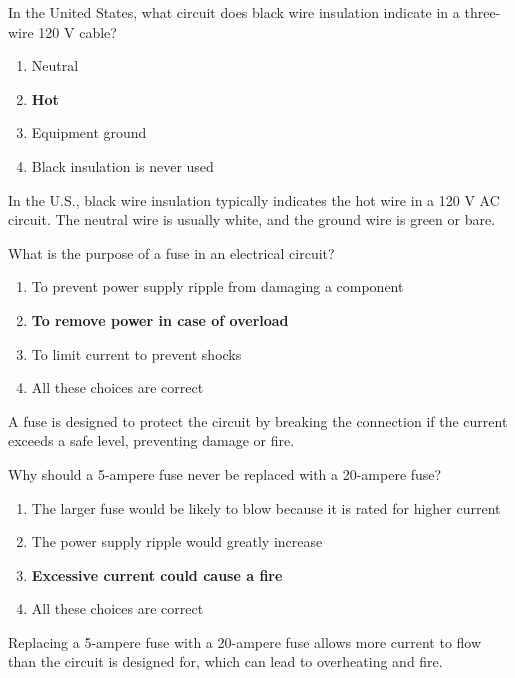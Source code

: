 
\begin{tcolorbox}[colback=gray!10!white,colframe=black!75!black,title={T0A03}]
    In the United States, what circuit does black wire insulation indicate in a three-wire 120 V cable?
    \begin{enumerate}[label=\Alph*,noitemsep]
        \item Neutral
        \item \textbf{Hot}
        \item Equipment ground
        \item Black insulation is never used
    \end{enumerate}
\end{tcolorbox}
In the U.S., black wire insulation typically indicates the hot wire in a 120 V AC circuit. The neutral wire is usually white, and the ground wire is green or bare.


\begin{tcolorbox}[colback=gray!10!white,colframe=black!75!black,title={T0A04}]
    What is the purpose of a fuse in an electrical circuit?
    \begin{enumerate}[label=\Alph*,noitemsep]
        \item To prevent power supply ripple from damaging a component
        \item \textbf{To remove power in case of overload}
        \item To limit current to prevent shocks
        \item All these choices are correct
    \end{enumerate}
\end{tcolorbox}
A fuse is designed to protect the circuit by breaking the connection if the current exceeds a safe level, preventing damage or fire.


\begin{tcolorbox}[colback=gray!10!white,colframe=black!75!black,title={T0A05}]
    Why should a 5-ampere fuse never be replaced with a 20-ampere fuse?
    \begin{enumerate}[label=\Alph*,noitemsep]
        \item The larger fuse would be likely to blow because it is rated for higher current
        \item The power supply ripple would greatly increase
        \item \textbf{Excessive current could cause a fire}
        \item All these choices are correct
    \end{enumerate}
\end{tcolorbox}
Replacing a 5-ampere fuse with a 20-ampere fuse allows more current to flow than the circuit is designed for, which can lead to overheating and fire.

